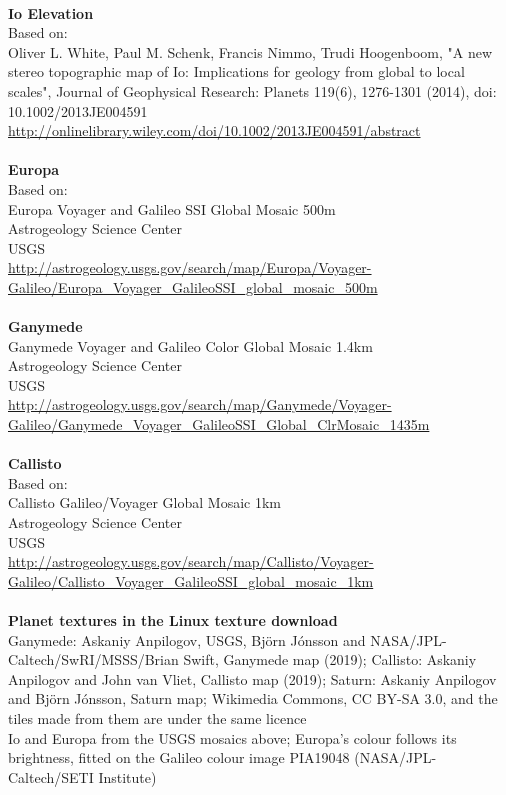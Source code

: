 \documentclass[Orbiter User Manual.tex]{subfiles}
\begin{document}
\\
\textbf{Io Elevation}\\
Based on:\\
Oliver L. White, Paul M. Schenk, Francis Nimmo, Trudi Hoogenboom, "A new stereo topographic map of Io: Implications for geology from global to local scales", Journal of Geophysical Research: Planets 119(6), 1276-1301 (2014), doi: 10.1002/2013JE004591\\
\url{http://onlinelibrary.wiley.com/doi/10.1002/2013JE004591/abstract}\\
\\
\textbf{Europa}\\
Based on:\\
Europa Voyager and Galileo SSI Global Mosaic 500m\\
Astrogeology Science Center\\
USGS\\
\url{http://astrogeology.usgs.gov/search/map/Europa/Voyager-Galileo/Europa_Voyager_GalileoSSI_global_mosaic_500m}\\
\\
\textbf{Ganymede}\\
Ganymede Voyager and Galileo Color Global Mosaic 1.4km\\
Astrogeology Science Center\\
USGS\\
\url{http://astrogeology.usgs.gov/search/map/Ganymede/Voyager-Galileo/Ganymede_Voyager_GalileoSSI_Global_ClrMosaic_1435m}\\
\\
\textbf{Callisto}\\
Based on:\\
Callisto Galileo/Voyager Global Mosaic 1km\\
Astrogeology Science Center\\
USGS\\
\url{http://astrogeology.usgs.gov/search/map/Callisto/Voyager-Galileo/Callisto_Voyager_GalileoSSI_global_mosaic_1km}\\
\\
\textbf{Planet textures in the Linux texture download}\\
Ganymede: Askaniy Anpilogov, USGS, Björn Jónsson and NASA/JPL-Caltech/SwRI/MSSS/Brian Swift, Ganymede map (2019); Callisto: Askaniy Anpilogov and John van Vliet, Callisto map (2019); Saturn: Askaniy Anpilogov and Björn Jónsson, Saturn map; Wikimedia Commons, CC BY-SA 3.0, and the tiles made from them are under the same licence\\
Io and Europa from the USGS mosaics above; Europa's colour follows its brightness, fitted on the Galileo colour image PIA19048 (NASA/JPL-Caltech/SETI Institute)\\
\end{document}
